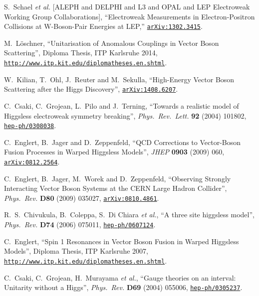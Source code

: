 \documentclass[english,12pt]{article}
\begin{document}
\begin{thebibliography}{10}
  S.~Schael {\it et al.}  [ALEPH and DELPHI and L3 and OPAL and LEP Electroweak Working Group Collaborations],
  ``Electroweak Measurements in Electron-Positron Collisions at W-Boson-Pair Energies at LEP,''
  \href{http://arxiv.org/abs/1302.3415}{{\tt arXiv:1302.3415}}.

M.~L\"oschner, ``Unitarisation of Anomalous Couplings 
in Vector Boson Scattering'', {Diploma Thesis, ITP Karlsruhe 2014}, 
\href{http://www.itp.kit.edu/diplomatheses.en.shtml}{{\tt http://www.itp.kit.edu/diplomatheses.en.shtml}}.

W.~Kilian, T.~Ohl, J.~Reuter and M.~Sekulla,
``{High-Energy Vector Boson Scattering after the Higgs Discovery}'',
 \href{http://arxiv.org/abs/1408.6207}{{\tt arXiv:1408.6207}}.

C.~Csaki, C.~Grojean, L.~Pilo and J.~Terning, ``{Towards a realistic model of
  Higgsless electroweak symmetry breaking}'', {\em Phys.\ Rev.\ Lett.} {\bf 92}
  (2004) 101802,
\href{http://www.arXiv.org/abs/hep-ph/0308038}{{\tt hep-ph/0308038}}.

  C.~Englert, B.~Jager and D.~Zeppenfeld,
  ``QCD Corrections to Vector-Boson Fusion Processes in Warped Higgsless Models'',
  {\em JHEP} {\bf 0903 } (2009) 060,
 \href{http://arxiv.org/abs/0812.2564} {{\tt arXiv:0812.2564}}.

  C.~Englert, B.~Jager, M.~Worek and D.~Zeppenfeld,
  ``{Observing Strongly Interacting Vector Boson Systems at the CERN Large
  Hadron Collider}'',
  {\em Phys.\ Rev.} {\bf D80} (2009) 035027,
  \href{http://arxiv.org/abs/0810.4861}{{\tt arXiv:0810.4861}}.
  
  R.~S.~Chivukula, B.~Coleppa, S.~Di Chiara {\it et al.},
  ``{A three site higgsless model}'',
  {\em Phys.\ Rev.} {\bf D74} (2006) 075011,
\href{http://www.arXiv.org/abs/hep-ph/0607124}{{\tt hep-ph/0607124}}.
  
C.~Englert, ``Spin 1 Resonances in Vector Boson Fusion in Warped Higgsless
  Models'', {Diploma Thesis, ITP Karlsruhe 2007}, {\href{http://www.itp.kit.edu/diplomatheses.en.shtml}{\tt http://www.itp.kit.edu/diplomatheses.en.shtml}}.

C.~Csaki, C.~Grojean, H.~Murayama {\it et al.}, ``{Gauge theories
  on an interval: Unitarity without a Higgs}'', {\em Phys.\ Rev.} {\bf D69}
  (2004) 055006,
\href{http://www.arXiv.org/abs/hep-ph/0305237}{{\tt hep-ph/0305237}}.


\end{thebibliography}
\end{document}
